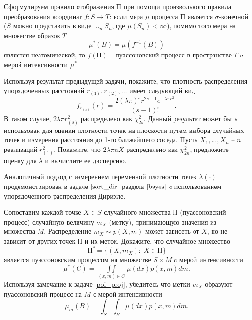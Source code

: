 \begin{problem}
\begin{problem}
\end{problem}

\begin{remark}
Сформулируем правило отображения $\text{П}$ при помощи произвольного правила преобразования координат $f: S \to T$: если мера $\mu$ процесса $\text{П}$ является $\sigma$-конечной ($S$ можно представить в виде $\cup_n S_n$, где $\mu(S_n) < \infty$), помимо того мера на множестве образов $T$ 
\[
\mu^{*}(B) = \mu( f^{-1} (B))
\]  
является неатомической, то $f(\text{П})$ -- пуассоновский процесс в пространстве $T$ c  мерой интенсивности $\mu^{*}$.
\end{remark}

\begin{problem}
Используя результат предыдущей задачи, покажите, что плотность распределения упорядоченных расстояний $r_{(1)}, r_{(2)}, \ldots$ имеет следующий вид
\[
f_{r_{(s)}} (r) = \frac{2 (\lambda \pi)^s r_{}^{2s - 1} e^{-\lambda \pi r_{}^2}}{ (s-1)! }. 
\]  
В таком случае, $2 \lambda \pi r_{(s)}^2$ распределено как $\chi_{2s}^{2}$. Данный результат может быть использован для оценки плотности точек на плоскости путем выбора случайных точек и измерения расстояния до 1-го ближайшего соседа. Пусть $X_1, \ldots, X_n$ -- $n$ реализаций $r_{(1)}^{2}$. Покажите, что $2\lambda \pi n \overline{X}$ распределено как $\chi_{2n}^{2}$, предложите оценку для $\lambda$ и вычислите ее дисперсию.
\end{problem}

\begin{remark}
Аналогичный подход с измерением переменной плотности точек $\lambda(\cdot)$ продемонстрирован в задаче $\ref{sort_dir}$ раздела $\ref{bayes}$  c использованием упорядоченного распределения Дирихле.
\end{remark}

\begin{problem}
Сопоставим каждой точке $X \in S$ случайного множества  $\text{П}$ (пуассоновский процесс) случайную величину $m_X$ (метку), принимающую значения из множества $M$.
Распределение $m_X \sim p(X, m)$ может зависеть от  $X$, но не зависит от других точек $\text{П}$ и их меток. Докажите, что случайное множество
\[
\text{П}^{*} = \{(X, m_X): \; X \in \text{П}\}
\]
является пуассоновским процессом на множестве $S \times M$ c мерой интенсивности
\[
\mu^{*}(C) = \mathop{\int\int} \limits_{(x,m) \in C} \mu(dx) p(x, m) dm.
\]
Используя замечание к задаче \ref{poi_proj}, убедитесь что метки  $m_X$ образуют пуассоновский процесс на $M$ с мерой интенсивности 
\[
\mu_m(B) = \int_{S}\int_{B}  \mu(dx) p(x, m) dm. 
\]
\end{problem}


\end{problem}
